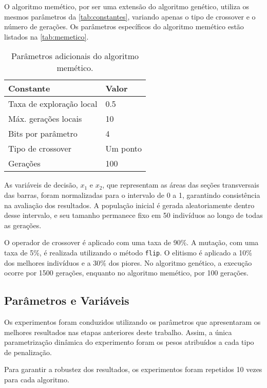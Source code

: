 O algoritmo memético, por ser uma extensão do algoritmo genético, utiliza os mesmos parâmetros da \autoref{tab:constantes}, variando apenas o tipo de crossover e o número de gerações. Os parâmetros específicos do algoritmo memético estão listados na \autoref{tab:memetico}.

\begin{table}[htb]
    \center%
    \begin{tabular}{l l}
        \bottomrule
        \textbf{Constante}    & \textbf{Valor} \\ \midrule
        Taxa de exploração local & 0.5          \\ \midrule
        Máx. gerações locais   & 10            \\ \midrule
        Bits por parâmetro     & 4             \\ \midrule
        Tipo de crossover      & Um ponto      \\ \midrule
        Gerações               & 100           \\ \toprule
    \end{tabular}
    \caption{Parâmetros adicionais do algoritmo memético.}%
    \label{tab:memetico}
\end{table}

As variáveis de decisão, \(x_1\) e \(x_2\), que representam as áreas das seções transversais das barras, foram normalizadas para o intervalo de 0 a 1, garantindo consistência na avaliação dos resultados. A população inicial é gerada aleatoriamente dentro desse intervalo, e seu tamanho permanece fixo em 50 indivíduos ao longo de todas as gerações.

O operador de \gls{crossover} é aplicado com uma taxa de 90\%. A mutação, com uma taxa de 5\%, é realizada utilizando o método \texttt{flip}. O elitismo é aplicado a 10\% dos melhores indivíduos e a 30\% dos piores. No algoritmo genético, a execução ocorre por 1500 gerações, enquanto no algoritmo memético, por 100 gerações.

\subsection{Parâmetros e Variáveis}

Os experimentos foram conduzidos utilizando os parâmetros que apresentaram os melhores resultados nas etapas anteriores deste trabalho. Assim, a única parametrização dinâmica do experimento foram os pesos atribuídos a cada tipo de penalização.

Para garantir a robustez dos resultados, os experimentos foram repetidos 10 vezes para cada algoritmo.
